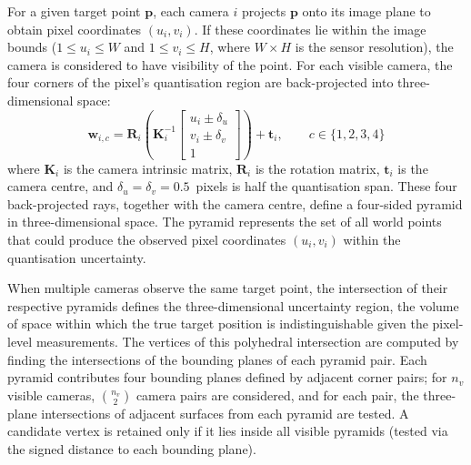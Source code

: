 For a given target point $\mathbf{p}$, each camera $i$ projects $\mathbf{p}$ onto its image plane to obtain pixel coordinates $(u_i, v_i)$. If these coordinates lie within the image bounds ($1 \leq u_i \leq W$ and $1 \leq v_i \leq H$, where $W \times H$ is the sensor resolution), the camera is considered to have visibility of the point. For each visible camera, the four corners of the pixel's quantisation region are back-projected into three-dimensional space:
%
\begin{equation}
\label{eq:backproject}
\mathbf{w}_{i,c} = \mathbf{R}_i \left( \mathbf{K}_i^{-1} \begin{bmatrix} u_i \pm \delta_u \\ v_i \pm \delta_v \\ 1 \end{bmatrix} \right) + \mathbf{t}_i, \qquad c \in \{1,2,3,4\}
\end{equation}
%
where $\mathbf{K}_i$ is the camera intrinsic matrix, $\mathbf{R}_i$ is the rotation matrix, $\mathbf{t}_i$ is the camera centre, and $\delta_u = \delta_v = 0.5$~pixels is half the quantisation span. These four back-projected rays, together with the camera centre, define a four-sided pyramid in three-dimensional space. The pyramid represents the set of all world points that could produce the observed pixel coordinates $(u_i, v_i)$ within the quantisation uncertainty.

When multiple cameras observe the same target point, the intersection of their respective pyramids defines the three-dimensional uncertainty region, the volume of space within which the true target position is indistinguishable given the pixel-level measurements. The vertices of this polyhedral intersection are computed by finding the intersections of the bounding planes of each pyramid pair. Each pyramid contributes four bounding planes defined by adjacent corner pairs; for $n_v$ visible cameras, $\binom{n_v}{2}$ camera pairs are considered, and for each pair, the three-plane intersections of adjacent surfaces from each pyramid are tested. A candidate vertex is retained only if it lies inside all visible pyramids (tested via the signed distance to each bounding plane).

